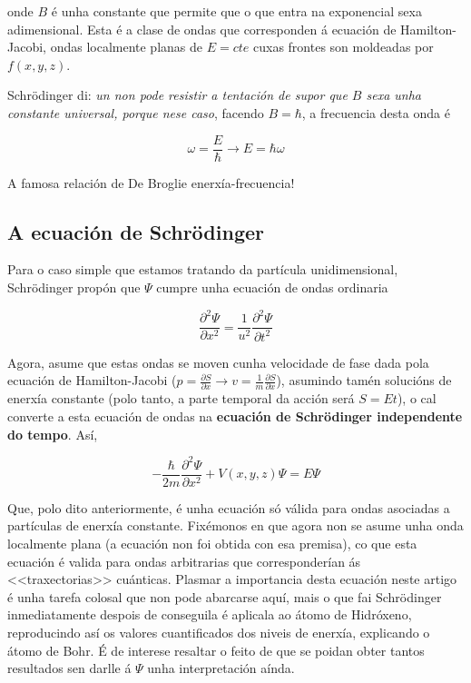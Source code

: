 \begin{refsection}
\begin{multicols}{2}
onde $B$ é unha constante que permite que o que entra na exponencial sexa
adimensional. Esta é a clase de ondas que corresponden á ecuación de
Hamilton-Jacobi, ondas localmente planas de $E=cte$ cuxas frontes son moldeadas
por $f(x,y,z)$.

Schrödinger di: \textit{un non pode resistir a tentación de supor que $B$ sexa
unha constante universal, porque nese caso}, facendo $B=\hbar$, a frecuencia
desta onda é

\begin{equation}
    \omega=\frac{E}{\hbar} \rightarrow \boxed{E=\hbar \omega}
\end{equation}

A famosa relación de De Broglie enerxía-frecuencia!

\subsection*{A ecuación de Schrödinger}

Para o caso simple que estamos tratando da partícula unidimensional,
Schrödinger propón que $\Psi$ cumpre unha ecuación de ondas ordinaria

\begin{equation}
        \frac{\partial^2 \Psi}{\partial x^2} =
        \frac{1}{u^2}\frac{\partial^2 \Psi}{\partial t^2}
\end{equation}

Agora, asume que estas ondas se moven cunha velocidade de fase dada pola
ecuación de Hamilton-Jacobi ($p=\frac{\partial S}{\partial x} \rightarrow v=
\frac{1}{m} \frac{\partial S}{\partial x}$), asumindo tamén solucións de
enerxía constante (polo tanto, a parte temporal da acción será $S=Et$), o cal
converte a esta ecuación de ondas na \textbf{ecuación de Schrödinger
independente do tempo}. Así,

\begin{equation}
    \boxed{
        -\frac{\hbar}{2m}\frac{\partial^2\Psi}{\partial x^2} +
        V(x,y,z)\Psi = E\Psi
    }
\end{equation}

Que, polo dito anteriormente, é unha ecuación só válida para ondas asociadas a
partículas de enerxía constante. Fixémonos en que agora non se asume unha onda localmente
plana (a ecuación non foi obtida con esa premisa), co que esta ecuación é
valida para ondas arbitrarias que corresponderían ás <<traxectorias>>
cuánticas. Plasmar a importancia desta ecuación neste artigo é unha tarefa
colosal que non pode abarcarse aquí, mais o que fai Schrödinger inmediatamente
despois de conseguila é aplicala ao átomo de Hidróxeno, reproducindo así os
valores cuantificados dos niveis de enerxía, explicando o átomo de Bohr. É de
interese resaltar o feito de que se poidan obter tantos resultados sen darlle á
$\Psi$ unha interpretación aínda.


\nocite{schrodinger.e_1926}
\nocite{schrodinger.e_1926_2}
\nocite{hamilton_optico_mechanical}
\nocite{hamilton_jacobi_equation}

\printbibliography

\end{multicols}
\end{refsection}
